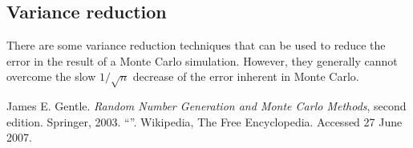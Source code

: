 \documentclass[12pt]{article}
\begin{document}
\subsection*{Variance reduction}

There are some variance reduction techniques
that can be used to reduce the error in the result
of a Monte Carlo simulation.
However, they generally cannot overcome the 
slow $1/\sqrt{n}$ decrease of the error inherent in Monte Carlo.


\begin{thebibliography}{6}
James E. Gentle. \emph{Random Number Generation and Monte Carlo Methods},
second edition.  Springer, 2003. 
``''. Wikipedia, The Free Encyclopedia. 
Accessed 27 June 2007.
\end{thebibliography}

\end{document}
